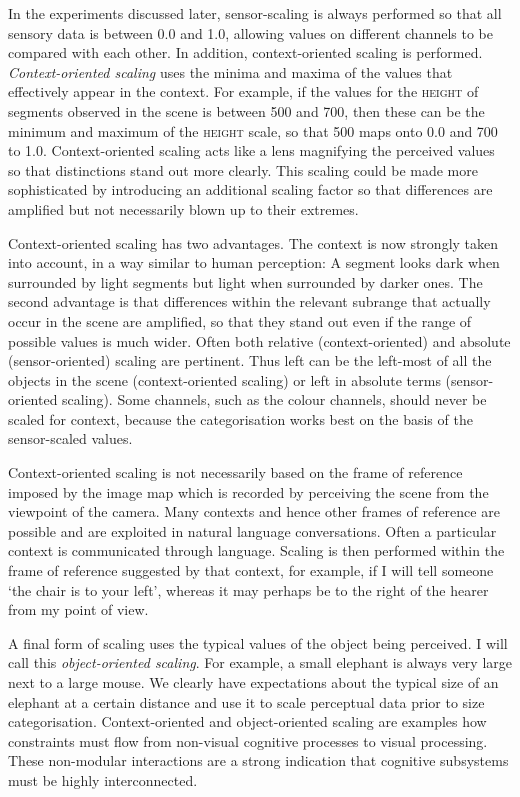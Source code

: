In the experiments discussed later, 
sensor-scaling is always performed so that all sensory data
is between 0.0 and 1.0, allowing values on different channels 
to be compared with 
each other. In addition, context-oriented scaling is performed.
{\itshape Context-oriented scaling} uses the minima and maxima of the 
values that effectively appear in the context.
For example, if the values for the \textsc{height} of segments 
observed in the scene is between 500 and 700, 
then these can be the minimum and maximum of the 
\textsc{height} scale, so that 500 maps onto 0.0 and 700 to 1.0. 
Context-oriented scaling acts like a lens
magnifying the perceived values so that distinctions
stand out more clearly. This scaling could 
be made more sophisticated by introducing an additional scaling factor so that 
differences are amplified but not necessarily blown up to their extremes. 

Context-oriented scaling has two advantages. The 
context is now strongly taken into
account, in a way similar to human perception: A segment
looks dark when surrounded by light segments but
light when surrounded by darker ones. The second advantage is 
that differences within the relevant subrange that 
actually occur in the scene are amplified, so that 
they stand out even if the range of possible values is
much wider. Often both relative (context-oriented) 
and absolute (sensor-oriented) scaling 
are pertinent. Thus left can be
the left-most of all the objects in the scene (context-oriented
scaling) or left in absolute terms (sensor-oriented scaling). 
Some channels, such as the colour channels, should never be scaled
for context, because the categorisation works best on the basis of 
the sensor-scaled values. 

Context-oriented scaling is not necessarily based on the 
frame of reference imposed by the image map which is 
recorded by perceiving the scene from the viewpoint of 
the camera. Many contexts and hence other frames of reference
are possible and are exploited in natural language 
conversations. Often a particular context is communicated through 
language. Scaling is then performed within the
frame of reference suggested by that context, 
for example, if I will tell someone `the chair is to
your left', whereas it may perhaps be to the right of the
hearer from my point of view. 

A final form of scaling uses the typical values of the object being 
perceived. I will call this {\itshape object-oriented scaling}. 
For example, a small elephant is always
very large next to a large mouse. We clearly
have expectations about the typical size of an elephant at
a certain distance and use it to scale
perceptual data prior to size 
categorisation. Context-oriented and object-oriented scaling
are examples how constraints must flow 
from non-visual cognitive processes to visual processing. 
These non-modular interactions are a strong
indication that cognitive subsystems must be highly 
interconnected. 

